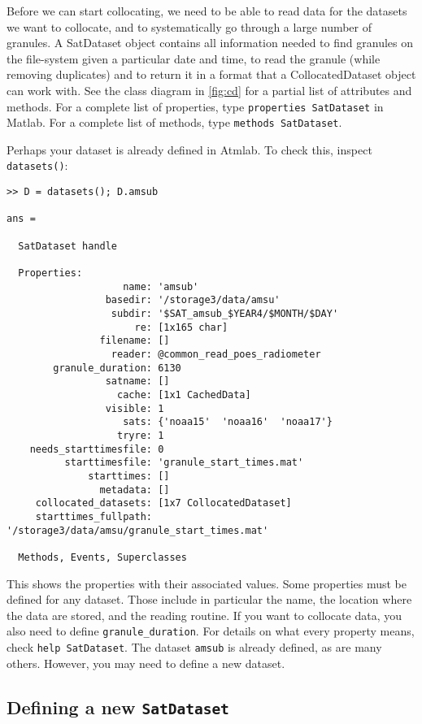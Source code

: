 \documentclass[a4paper,10pt]{article}
\begin{document}
Before we can start collocating, we need to be able to read data for the
datasets we want to collocate, and to systematically go through a large number of granules.
A SatDataset object contains all information needed to find granules on the
file-system given a particular date and time, to read the granule (while
removing duplicates) and to return it in a format that a CollocatedDataset object can
work with.
See the class diagram in \autoref{fig:cd} for a partial list of attributes and
methods.
For a complete list of properties, type \lstinline|properties SatDataset|
in Matlab.
For a complete list of methods, type \lstinline|methods SatDataset|.

Perhaps your dataset is already defined in Atmlab.
To check this, inspect \lstinline|datasets()|:

\begin{lstlisting}
>> D = datasets(); D.amsub

ans = 

  SatDataset handle

  Properties:
                    name: 'amsub'
                 basedir: '/storage3/data/amsu'
                  subdir: '$SAT_amsub_$YEAR4/$MONTH/$DAY'
                      re: [1x165 char]
                filename: []
                  reader: @common_read_poes_radiometer
        granule_duration: 6130
                 satname: []
                   cache: [1x1 CachedData]
                 visible: 1
                    sats: {'noaa15'  'noaa16'  'noaa17'}
                   tryre: 1
    needs_starttimesfile: 0
          starttimesfile: 'granule_start_times.mat'
              starttimes: []
                metadata: []
     collocated_datasets: [1x7 CollocatedDataset]
     starttimes_fullpath: '/storage3/data/amsu/granule_start_times.mat'

  Methods, Events, Superclasses

\end{lstlisting}

This shows the properties with their associated values.
Some properties must be defined for any dataset.
Those include in particular the name, the location where the data are
stored, and the reading routine.
If you want to collocate data, you also need to define
\lstinline|granule_duration|.
For details on what every property means, check \lstinline|help SatDataset|.
The dataset \lstinline|amsub| is already defined, as are many others.
However, you may need to define a new dataset.

\subsection{Defining a new \lstinline|SatDataset|}
\end{document}
